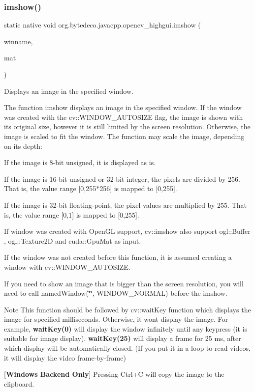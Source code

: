 \subsubsection{\texorpdfstring{imshow()}{imshow()}}
{\footnotesize\ttfamily static native void org.\+bytedeco.\+javacpp.\+opencv\+\_\+highgui.\+imshow (\begin{DoxyParamCaption}\item[{@Str Byte\+Pointer}]{winname,  }\item[{@By\+Val Mat}]{mat }\end{DoxyParamCaption})\hspace{0.3cm}{\ttfamily [static]}}



Displays an image in the specified window. 

The function imshow displays an image in the specified window. If the window was created with the cv\+::\+W\+I\+N\+D\+O\+W\+\_\+\+A\+U\+T\+O\+S\+I\+ZE flag, the image is shown with its original size, however it is still limited by the screen resolution. Otherwise, the image is scaled to fit the window. The function may scale the image, depending on its depth\+: 


\begin{DoxyItemize}
\item If the image is 8-\/bit unsigned, it is displayed as is.
\item If the image is 16-\/bit unsigned or 32-\/bit integer, the pixels are divided by 256. That is, the value range \mbox{[}0,255$\ast$256\mbox{]} is mapped to \mbox{[}0,255\mbox{]}.
\item If the image is 32-\/bit floating-\/point, the pixel values are multiplied by 255. That is, the value range \mbox{[}0,1\mbox{]} is mapped to \mbox{[}0,255\mbox{]}. 
\end{DoxyItemize}

If window was created with Open\+GL support, cv\+::imshow also support ogl\+::\+Buffer , ogl\+::\+Texture2D and cuda\+::\+Gpu\+Mat as input. 

If the window was not created before this function, it is assumed creating a window with cv\+::\+W\+I\+N\+D\+O\+W\+\_\+\+A\+U\+T\+O\+S\+I\+ZE. 

If you need to show an image that is bigger than the screen resolution, you will need to call named\+Window(\char`\"{}\char`\"{}, W\+I\+N\+D\+O\+W\+\_\+\+N\+O\+R\+M\+AL) before the imshow. 

\begin{DoxyNote}{Note}
This function should be followed by cv\+::wait\+Key function which displays the image for specified milliseconds. Otherwise, it won\textquotesingle{}t display the image. For example, {\bfseries wait\+Key(0)} will display the window infinitely until any keypress (it is suitable for image display). {\bfseries wait\+Key(25)} will display a frame for 25 ms, after which display will be automatically closed. (If you put it in a loop to read videos, it will display the video frame-\/by-\/frame) 


\end{DoxyNote}
\mbox{[}{\bfseries Windows Backend Only}\mbox{]} Pressing Ctrl+C will copy the image to the clipboard. 

